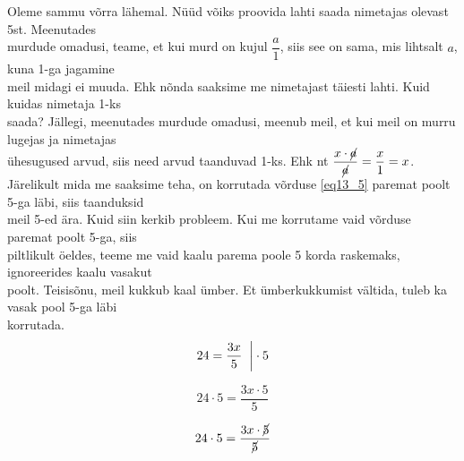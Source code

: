 \begin{center}
{{{\begin{flushleft}
\hspace{5mm}
Oleme sammu võrra lähemal. Nüüd võiks proovida lahti saada nimetajas olevast 5st. Meenutades\\ \hspace{5mm} murdude omadusi, teame, et kui murd on kujul $\dfrac{a}{1}$, siis see on sama, mis lihtsalt $a$, kuna 1-ga jagamine\\ \hspace{5mm} meil midagi ei muuda. Ehk nõnda saaksime me nimetajast täiesti lahti. Kuid kuidas nimetaja 1-ks\\ \hspace{5mm} saada? Jällegi, meenutades murdude omadusi, meenub meil, et kui meil on murru lugejas ja nimetajas\\ \hspace{5mm} ühesugused arvud, siis need arvud taanduvad 1-ks. Ehk nt $\dfrac{x \cdot \cancel{a}}{\cancel{a}}=\dfrac{x}{1}=x$.\\
\vspace{2mm}
\hspace{5mm} Järelikult mida me saaksime teha, on korrutada võrduse \ref{eq13_5} paremat poolt 5-ga läbi, siis taanduksid\\ \hspace{5mm} meil 5-ed ära. Kuid siin kerkib probleem. Kui me korrutame vaid võrduse paremat poolt 5-ga, siis\\ \hspace{5mm} piltlikult öeldes, teeme me vaid kaalu parema poole 5 korda raskemaks, ignoreerides kaalu vasakut\\ \hspace{5mm} poolt. Teisisõnu, meil kukkub kaal ümber. Et ümberkukkumist vältida, tuleb ka vasak pool 5-ga läbi \\ \hspace{5mm} korrutada.\\

\begin{equation}
\label{eq13_6}
24 = \dfrac{3x}{5} \hspace{2mm} \bigg| \cdot 5 
\end{equation}


\begin{equation}
\label{eq13_7}
24 \cdot 5 = \dfrac{3x \cdot 5}{5} 
\end{equation}

\begin{equation}
\label{eq13_8}
24 \cdot 5 = \dfrac{3x \cdot \cancel{5}}{\cancel{5}} 
\end{equation}


\end{flushleft}}}}
\end{center}
